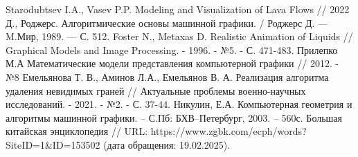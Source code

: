 \begin{thebibliography}{}
	 Starodubtsev I.A., Vasev P.P. Modeling and Visualization of Lava Flows // 2022
	 Д., Роджерс. Алгоритмические основы машинной графики. / Роджерс Д.
	— M.Мир, 1989. — С. 512. 
	 Foster N., Metaxas D. Realistic Animation of Liquids // Graphical Models and Image Processing. - 1996. - №5. - С. 471-483.
	 Прилепко М.А Математические модели представления компьютерной графики // 2012. - №8
	 Емельянова Т. В., Аминов Л.А., Емельянов В. А. Реализация алгоритма удаления невидимых граней // Актуальные проблемы военно-научных исследований. - 2021. - №2. - С. 37-44.
	 Никулин, Е.А. Компьютерная геометрия и алгоритмы машинной
	графики. – С.Пб: БХВ–Петербург, 2003. – 560с. 
	 Большая китайская энциклопедия // URL: https://www.zgbk.com/ecph/words?SiteID=1\&ID=153502 (дата обращения: 19.02.2025).
	
\end{thebibliography}
